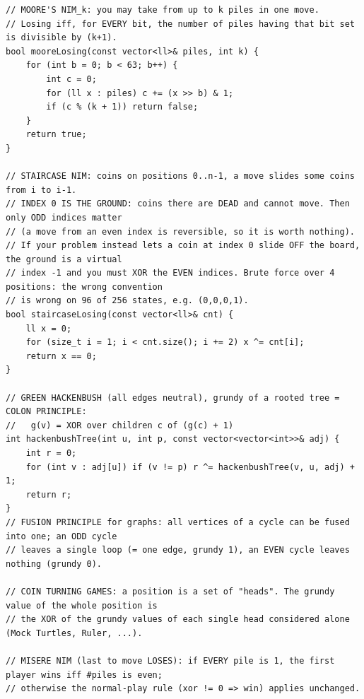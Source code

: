 \documentclass[9pt,a4paper,twocolumn]{extarticle}
\begin{document}
\begin{lstlisting}
// MOORE'S NIM_k: you may take from up to k piles in one move.
// Losing iff, for EVERY bit, the number of piles having that bit set is divisible by (k+1).
bool mooreLosing(const vector<ll>& piles, int k) {
    for (int b = 0; b < 63; b++) {
        int c = 0;
        for (ll x : piles) c += (x >> b) & 1;
        if (c % (k + 1)) return false;
    }
    return true;
}

// STAIRCASE NIM: coins on positions 0..n-1, a move slides some coins from i to i-1.
// INDEX 0 IS THE GROUND: coins there are DEAD and cannot move. Then only ODD indices matter
// (a move from an even index is reversible, so it is worth nothing).
// If your problem instead lets a coin at index 0 slide OFF the board, the ground is a virtual
// index -1 and you must XOR the EVEN indices. Brute force over 4 positions: the wrong convention
// is wrong on 96 of 256 states, e.g. (0,0,0,1).
bool staircaseLosing(const vector<ll>& cnt) {
    ll x = 0;
    for (size_t i = 1; i < cnt.size(); i += 2) x ^= cnt[i];
    return x == 0;
}

// GREEN HACKENBUSH (all edges neutral), grundy of a rooted tree = COLON PRINCIPLE:
//   g(v) = XOR over children c of (g(c) + 1)
int hackenbushTree(int u, int p, const vector<vector<int>>& adj) {
    int r = 0;
    for (int v : adj[u]) if (v != p) r ^= hackenbushTree(v, u, adj) + 1;
    return r;
}
// FUSION PRINCIPLE for graphs: all vertices of a cycle can be fused into one; an ODD cycle
// leaves a single loop (= one edge, grundy 1), an EVEN cycle leaves nothing (grundy 0).

// COIN TURNING GAMES: a position is a set of "heads". The grundy value of the whole position is
// the XOR of the grundy values of each single head considered alone (Mock Turtles, Ruler, ...).

// MISERE NIM (last to move LOSES): if EVERY pile is 1, the first player wins iff #piles is even;
// otherwise the normal-play rule (xor != 0 => win) applies unchanged.
\end{lstlisting}

\filbreak
\end{document}
